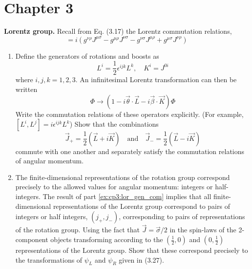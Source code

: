 \section{Chapter 3}

\setcounter{equation}{150}
\problem \textbf{Lorentz group.} Recall from Eq. (3.17) the Lorentz commutation relations,
\begin{equation*}
    [J^{\mu\nu}, J^{\rho\sigma}] = i(g^{\nu\rho}J^{\mu\sigma} - g^{\mu\rho}J^{\nu\sigma} - g^{\nu\sigma}J^{\mu\rho} + g^{\mu\sigma}J^{\nu\rho})
\end{equation*}
\begin{enumerate}[label = {(\alph*)}, ref = {(\alph*)}]
    \item \label{ex:cp3:lor_gen_com} 
    Define the generators of rotations and boosts as
    \begin{equation*}
        L^i = \frac{1}{2}\epsilon^{ijk} L^k, \quad K^i = J^{0i}
    \end{equation*}
    where $i, j, k = 1, 2, 3$. An infinitesimal Lorentz transformation can then be written
    \begin{equation*}
        \Phi \to \left(1 - i\vec{\theta}\cdot\vec{L} - i\vec{\beta}\cdot\vec{K}\right)\Phi
    \end{equation*}
    Write the commutation relations of these operators explicitly. (For example, $[L^i, L^j] = i\epsilon^{ijk}L^k$)
    Show that the combinations 
    \begin{equation*}
        \vec{J}_{+} = \frac{1}{2} \left(\vec{L} + i\vec{K}\right) \quad \text{and} 
        \quad \vec{J}_{-} = \frac{1}{2} \left(\vec{L} - i\vec{K}\right)
    \end{equation*} 
    commute with one another and separately satisfy the commutation relations of angular momentum.

    \item The finite-dimensional representations of the rotation group correspond precisely to the allowed values for 
    angular momentum: integers or half-integers. The result of part \ref{ex:cp3:lor_gen_com} implies that all finite-dimensional
    representations of the Lorentz group correspond to pairs of integers or half integers, $(j_+, j_-)$, corresponding to pairs 
    of representations of the rotation group. Using the fact that $\vec{J} = \vec{\sigma} / 2$ in the spin-laws of the 2-component
    objects transforming according to the $(\frac{1}{2}, 0)$ and $(0, \frac{1}{2})$ representations of the Lorentz group. Show 
    that these correspond precisely to the transformations of $\psi_L$ and $\psi_R$ given in (3.27).


\end{enumerate}
